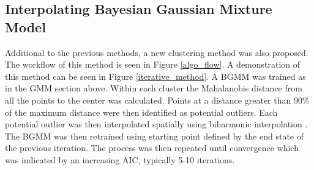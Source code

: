 \documentclass[a4paper,11pt]{article}
\begin{document}
\subsection{Interpolating Bayesian Gaussian Mixture Model}

Additional to the previous methods, a new clustering method was also proposed. The workflow of this method is seen in Figure \ref{algo_flow}.  A demonstration of this method can be seen in Figure \ref{iterative_method}. A BGMM was trained as in the GMM section above. Within each cluster the Mahalanobis distance \cite{Mahalanobis1936OnStatistics} from all the points to the center was calculated. Points at a distance greater than 90\% of the maximum distance were then identified as potential outliers. Each potential outlier was then interpolated spatially using biharmonic interpolation \cite{Damelin2017OnAspects}. The BGMM was then retrained using starting point defined by the end state of the previous iteration. The process was then repeated until convergence which was indicated by an increasing AIC, typically 5-10 iterations.
\end{document}
